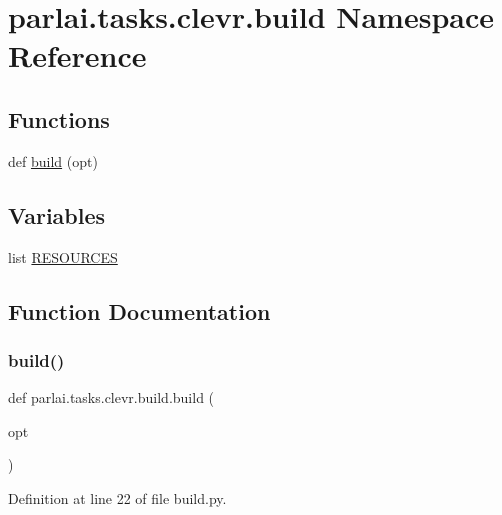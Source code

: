 \hypertarget{namespaceparlai_1_1tasks_1_1clevr_1_1build}{}\section{parlai.\+tasks.\+clevr.\+build Namespace Reference}
\label{namespaceparlai_1_1tasks_1_1clevr_1_1build}
\subsection*{Functions}
\begin{DoxyCompactItemize}
\item 
def \hyperlink{namespaceparlai_1_1tasks_1_1clevr_1_1build_a129ccb17872c5d5b1538020e5642ab91}{build} (opt)
\end{DoxyCompactItemize}
\subsection*{Variables}
\begin{DoxyCompactItemize}
\item 
list \hyperlink{namespaceparlai_1_1tasks_1_1clevr_1_1build_a5fb1a9daed505a003a5cb86a140a3d5e}{R\+E\+S\+O\+U\+R\+C\+ES}
\end{DoxyCompactItemize}


\subsection{Function Documentation}
\mbox{\label{namespaceparlai_1_1tasks_1_1clevr_1_1build_a129ccb17872c5d5b1538020e5642ab91}} 
\subsubsection{\texorpdfstring{build()}{build()}}
{\footnotesize\ttfamily def parlai.\+tasks.\+clevr.\+build.\+build (\begin{DoxyParamCaption}\item[{}]{opt }\end{DoxyParamCaption})}



Definition at line 22 of file build.\+py.


